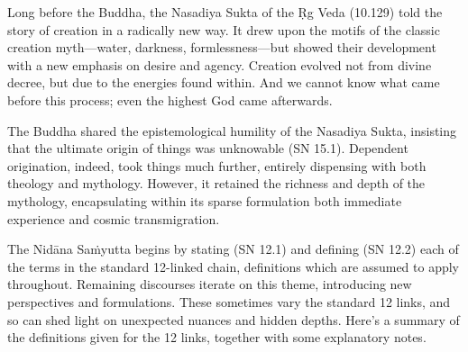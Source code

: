 \documentclass[12pt,openany]{book}%
\begin{document}
Long before the Buddha, the Nasadiya Sukta of the Ṛg Veda (10.129) told the story of creation in a radically new way. It drew upon the motifs of the classic creation myth—water, darkness, formlessness—but showed their development with a new emphasis on desire and agency. Creation evolved not from divine decree, but due to the energies found within. And we cannot know what came before this process; even the highest God came afterwards.

The Buddha shared the epistemological humility of the Nasadiya Sukta, insisting that the ultimate origin of things was unknowable (SN 15.1). Dependent origination, indeed, took things much further, entirely dispensing with both theology and mythology. However, it retained the richness and depth of the mythology, encapsulating within its sparse formulation both immediate experience and cosmic transmigration.

The \textsanskrit{Nidāna} \textsanskrit{Saṁyutta} begins by stating (SN 12.1) and defining (SN 12.2) each of the terms in the standard 12-linked chain, definitions which are assumed to apply throughout. Remaining discourses iterate on this theme, introducing new perspectives and formulations. These sometimes vary the standard 12 links, and so can shed light on unexpected nuances and hidden depths. Here’s a summary of the definitions given for the 12 links, together with some explanatory notes.
\end{document}
